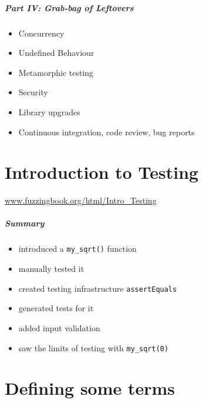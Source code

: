 \documentclass{beamer}
\newenvironment{changemargin}[1]{%
  \begin{list}{}{%
    \setlength{\topsep}{0pt}%
    \setlength{\leftmargin}{#1}%
    \setlength{\rightmargin}{1em}
    \setlength{\listparindent}{\parindent}%
    \setlength{\itemindent}{\parindent}%
    \setlength{\parsep}{\parskip}%
  }%
  \item[]}{\end{list}}
\begin{document}
\begin{frame}
\frametitle{Part IV: Grab-bag of Leftovers}
\begin{changemargin}{2em}
\Large
\begin{itemize}
\item Concurrency
\item Undefined Behaviour
\item Metamorphic testing
\item Security
\item Library upgrades
  \item Continuous integration, code review, bug reports
\end{itemize}
\end{changemargin}
\end{frame}

\part{Introduction to Testing}
\begin{frame}
 
  \partpage
  \Large
  \begin{center}
    \url{www.fuzzingbook.org/html/Intro_Testing}
  \end{center}
\end{frame}

\begin{frame}

  \frametitle{Summary}
    \begin{changemargin}{2em}
      \begin{itemize}
      \item introduced a {\tt my\_sqrt()} function
      \item manually tested it
      \item created testing infrastructure {\tt assertEquals}
      \item generated tests for it
      \item added input validation
      \item saw the limits of testing with {\tt my\_sqrt(0)}
      \end{itemize}
    \end{changemargin}
\end{frame}

\part{Defining some terms}
\begin{frame}
 
  \partpage
\end{frame}
\end{document}
